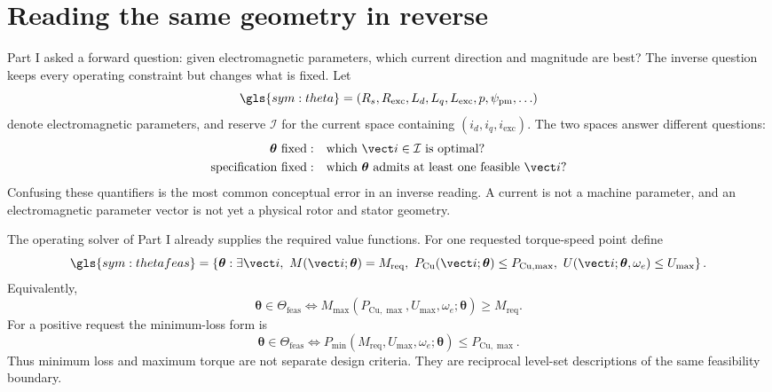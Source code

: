 \section{Reading the same geometry in reverse}
\label{sec:inverse-question}

Part I asked a forward question: given electromagnetic parameters, which
current direction and magnitude are best?  The inverse question keeps every
operating constraint but changes what is fixed.  Let
\begin{equation}
 \gls{sym:theta}=(R_s,R_{\mathrm{exc}},L_d,L_q,L_{\mathrm{exc}},
 p,\psi_{\mathrm{pm}},\ldots)
 \label{eq:theta-definition}
\end{equation}
denote electromagnetic parameters, and reserve \(\mathcal I\) for the current
space containing \((i_d,i_q,i_{\mathrm{exc}})\).  The two spaces answer
different questions:
\begin{align}
 \boldsymbol\theta\ \hbox{fixed}:&\quad
 \text{which }\vect i\in\mathcal I\text{ is optimal?}\\
 \text{specification fixed}:&\quad
 \text{which }\boldsymbol\theta\text{ admits at least one feasible }\vect i?
\end{align}
Confusing these quantifiers is the most common conceptual error in an inverse
reading.  A current is not a machine parameter, and an electromagnetic
parameter vector is not yet a physical rotor and stator geometry.

The operating solver of Part I already supplies the required value functions.
For one requested torque-speed point define
\begin{equation}
 \gls{sym:thetafeas}=
 \left\{\boldsymbol\theta:\exists\vect i,
 \ M(\vect i;\boldsymbol\theta)=M_{\mathrm{req}},\ 
 P_{\mathrm{Cu}}(\vect i;\boldsymbol\theta)\leq P_{\mathrm{Cu},\max},\ 
 U(\vect i;\boldsymbol\theta,\omega_e)\leq U_{\max}\right\}.
 \label{eq:theta-feas-exists}
\end{equation}
Equivalently,
\begin{equation}
 \boxed{\boldsymbol\theta\in\Theta_{\mathrm{feas}}
 \iff M_{\max}(P_{\mathrm{Cu},\max},U_{\max},\omega_e;
 \boldsymbol\theta)\geq M_{\mathrm{req}}.}
 \label{eq:inverse-value-test}
\end{equation}
For a positive request the minimum-loss form is
\begin{equation}
 \boldsymbol\theta\in\Theta_{\mathrm{feas}}
 \iff P_{\min}(M_{\mathrm{req}},U_{\max},\omega_e;
 \boldsymbol\theta)\leq P_{\mathrm{Cu},\max}.
 \label{eq:inverse-pmin-test}
\end{equation}
Thus minimum loss and maximum torque are not separate design criteria.  They
are reciprocal level-set descriptions of the same feasibility boundary.

